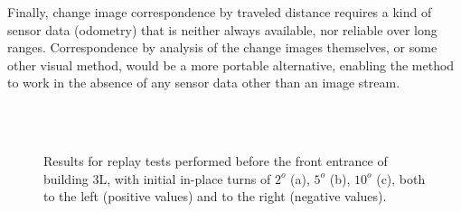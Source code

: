 \documentclass[twocolumn, 9pt,fleqn]{jsproceedings}
\begin{document}
Finally, change image correspondence by traveled distance requires a kind of sensor data (odometry) that is neither always available, nor reliable over long ranges. Correspondence by analysis of the change images themselves, or some other visual method, would be a more portable alternative, enabling the method to work in the absence of any sensor data other than an image stream.

\begin{figure}[h!]
\centering
{}\\
\\
\caption{Results for replay tests performed before the front entrance of building 3L, with initial in-place turns of $2^o$ (a),  $5^o$ (b), $10^o$ (c), both to the left (positive values) and to the right (negative values). }
\label{fig:replay_tests}
\end{figure}

\footnotesize




\normalsize
\end{document}
